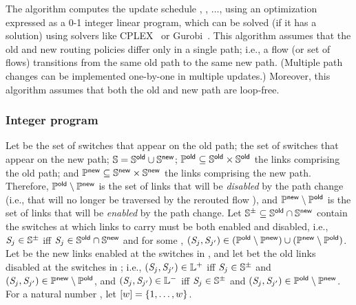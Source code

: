 The algorithm computes the update schedule , ,
$\ldots$, \updateID{\updateSteps} using an optimization expressed as a
0-1 integer linear program, which can be solved (if it has a solution)
using solvers like CPLEX~\cite{CPLEX} or Gurobi~\cite{gurobi}.  This algorithm assumes that the
old and new routing policies differ only in a single path; i.e., a
flow \flowID{} (or set of flows) transitions from the same old path to
the same new path.  (Multiple path changes can be implemented
one-by-one in multiple updates.)  Moreover, this algorithm assumes
that both the old and new path are loop-free.

\subsubsection{Integer program}
\label{sec:schedule:tsu:ip}

Let \oldSwitchesSet be the set of switches that appear on the old
path; \newSwitchesSet the set of switches that appear on the new path;
$\mathbb{S} = \mathbb{S}^{\mathsf{old}} \cup \mathbb{S}^{\mathsf{new}}$; $\mathbb{P}^{\mathsf{old}}{}
\subseteq \mathbb{S}^{\mathsf{old}} \times \mathbb{S}^{\mathsf{old}}$ the links comprising
the old path; and $\mathbb{P}^{\mathsf{new}}{} \subseteq \mathbb{S}^{\mathsf{new}} \times
\mathbb{S}^{\mathsf{new}}$ the links comprising the new path.  Therefore,
$\mathbb{P}^{\mathsf{old}}{} \setminus \mathbb{P}^{\mathsf{new}}{}$ is the set of links that will be
\textit{disabled} by the path change (i.e., that will no longer be
traversed by the rerouted flow \flowID{}), and $\mathbb{P}^{\mathsf{new}}{} \setminus
\mathbb{P}^{\mathsf{old}}{}$ is the set of links that will be \textit{enabled} by the
path change.  Let $\mathbb{S}^{\pm} \subseteq \mathbb{S}^{\mathsf{old}}
\cap \mathbb{S}^{\mathsf{new}}$ contain the switches at which links to carry
\flowID{} must be both enabled and disabled, i.e.,
$\switchID{\switchIdx} \in \switchesWLinkSwapSet$ iff
$\switchID{\switchIdx} \in \oldSwitchesSet \cap \newSwitchesSet$ and
for some \switchID{\switchIdxAlt}, $(\switchID{\switchIdx},
\switchID{\switchIdxAlt}) \in (\oldPathNB{} \setminus \newPathNB{}) \cup
(\newPathNB{} \setminus \oldPathNB{})$.  Let \enableLinksSet be the new links
enabled at the switches in \switchesWLinkSwapSet, and let
\disableLinksSet bet the old links disabled at the switches in
\switchesWLinkSwapSet; i.e., $(\switchID{\switchIdx},
\switchID{\switchIdxAlt}) \in \enableLinksSet$ iff
$\switchID{\switchIdx} \in \switchesWLinkSwapSet$ and
$(\switchID{\switchIdx}, \switchID{\switchIdxAlt}) \in \newPathNB{}
\setminus \oldPathNB{}$, and $(\switchID{\switchIdx},
\switchID{\switchIdxAlt}) \in \disableLinksSet$ iff
$\switchID{\switchIdx} \in \switchesWLinkSwapSet$ and
$(\switchID{\switchIdx}, \switchID{\switchIdxAlt}) \in \oldPathNB{}
\setminus \newPathNB{}$.  For a natural number \genericNat, let
$[{w}] = \{1, \ldots, w\}$.


